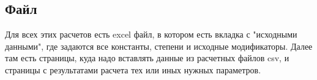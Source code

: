 \documentclass{article}
\begin{document}
\subsection{Файл}

Для всех этих расчетов есть excel файл, в котором есть вкладка с "исходными данными", где задаются все константы, степени и исходные модификаторы. Далее там есть страницы, куда надо вставлять данные из расчетных файлов csv, и страницы с результатами расчета тех или иных нужных параметров.
\end{document}
